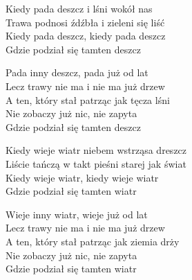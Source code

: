 
\begin{text}
    Kiedy pada deszcz i lśni wokół nas\\
    Trawa podnosi źdźbła i zieleni się liść\\
    Kiedy pada deszcz, kiedy pada deszcz\\
    Gdzie podział się tamten deszcz

    Pada inny deszcz, pada już od lat\\
    Lecz trawy nie ma i nie ma już drzew\\
    A ten, który stał patrząc jak tęcza lśni\\
    Nie zobaczy już nic, nie zapyta\\
    Gdzie podział się tamten deszcz

    Kiedy wieje wiatr niebem wstrząsa dreszcz\\
    Liście tańczą w takt pieśni starej jak świat\\
    Kiedy wieje wiatr, kiedy wieje wiatr\\
    Gdzie podział się tamten wiatr

    Wieje inny wiatr, wieje już od lat\\
    Lecz trawy nie ma i nie ma już drzew\\
    A ten, który stał patrząc jak ziemia drży\\
    Nie zobaczy już nic, nie zapyta\\
    Gdzie podział się tamten wiatr
\end{text}
\begin{chord}

\end{chord}